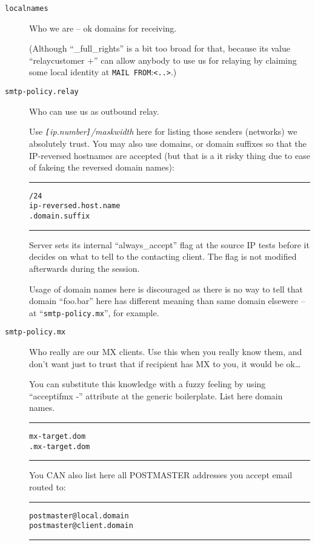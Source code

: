 \begin{description}
\item[\tt localnames] \mbox{}

Who we are -- ok domains for receiving.

(Although ``\_full\_rights'' is a bit too broad for that, because
 its value ``relaycustomer +'' can allow anybody to use us for relaying
 by claiming some local identity at {\tt MAIL FROM}:\verb/<..>/.)


\item[\tt smtp-policy.relay] \mbox{}

Who can use us as outbound relay.

Use  {\em\verb/[/ip.number\verb/]//maskwidth}  here for
listing those senders (networks) we absolutely trust.
You may also use domains, or domain suffixes so that the IP-reversed
hostnames are accepted (but that is a it risky thing due to ease of
fakeing the reversed domain names):

\begin{alltt}\medskip\hrule\medskip
[11.22.33.00]/24
ip-reversed.host.name
.domain.suffix
\medskip\hrule\end{alltt}\medskip

Server sets its internal ``always\_accept'' flag at the source IP tests
before it decides on what to tell to the contacting client.
The flag is not modified afterwards during the session.

Usage of domain names here is discouraged as there is no way to tell
that domain ``foo.bar'' here has different meaning than same domain
elsewere -- at ``{\tt smtp-policy.mx}'', for example.

\item[\tt smtp-policy.mx] \mbox{}

Who really are our MX clients.
Use this when you really know them, and don't want just to trust
that if recipient has MX to you, it would be ok\ldots

You can substitute this knowledge with a fuzzy feeling by using
``acceptifmx -'' attribute at the generic boilerplate.
List here domain names. 
\begin{alltt}\medskip\hrule\medskip
 mx-target.dom
 .mx-target.dom
\medskip\hrule\end{alltt}\medskip

You CAN also list here all POSTMASTER addresses you accept email routed to: 

\begin{alltt}\medskip\hrule\medskip
 postmaster@local.domain
 postmaster@client.domain
\medskip\hrule\end{alltt}\medskip


\end{description}
